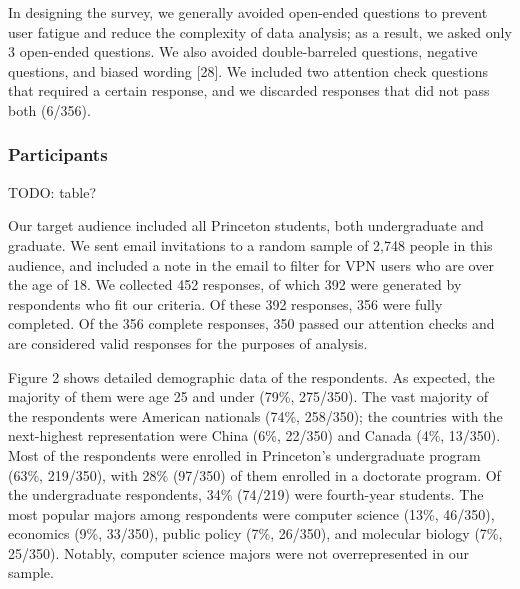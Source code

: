 In designing the survey, we generally avoided open-ended questions to prevent user fatigue and reduce the complexity of data analysis; as a result, we asked only 3 open-ended questions. We also avoided double-barreled questions, negative questions, and biased wording [28]. We included two attention check questions that required a certain response, and we discarded responses that did not pass both (6/356).

\subsubsection{Participants}

TODO: table?

Our target audience included all Princeton students, both undergraduate and graduate. We sent email invitations to a random sample of 2,748 people in this audience, and included a note in the email to filter for VPN users who are over the age of 18. We collected 452 responses, of which 392 were generated by respondents who fit our criteria. Of these 392 responses, 356 were fully completed. Of the 356 complete responses, 350 passed our attention checks and are considered valid responses for the purposes of analysis.

Figure 2 shows detailed demographic data of the respondents. As expected, the majority of them were age 25 and under (79\%, 275/350). The vast majority of the respondents were American nationals (74\%, 258/350); the countries with the next-highest representation were China (6\%, 22/350) and Canada (4\%, 13/350). Most of the respondents were enrolled in Princeton's undergraduate program (63\%, 219/350), with 28\% (97/350) of them enrolled in a doctorate program. Of the undergraduate respondents, 34\% (74/219) were fourth-year students. The most popular majors among respondents were computer science (13\%, 46/350), economics (9\%, 33/350), public policy (7\%, 26/350), and molecular biology (7\%, 25/350). Notably, computer science majors were not overrepresented in our sample.

